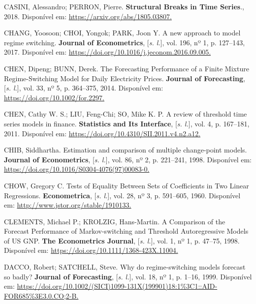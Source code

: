 \documentclass[
  letterpaper,
  DIV=11,
  numbers=noendperiod]{scrartcl}
\newlength{\cslhangindent}
\newenvironment{CSLReferences}[2] %
 {\begin{list}{}{%
  \setlength{\itemindent}{0pt}
  \setlength{\leftmargin}{0pt}
  \setlength{\parsep}{0pt}
  \ifodd #1
   \setlength{\leftmargin}{\cslhangindent}
   \setlength{\itemindent}{-1\cslhangindent}
  \fi
  \setlength{\itemsep}{#2\baselineskip}}}
 {\end{list}}
\numberwithin{equation}{section}
\numberwithin{table}{section}
\numberwithin{figure}{section}
\begin{document}
\begin{CSLReferences}{0}{1}
CASINI, Alessandro; PERRON, Pierre. \textbf{Structural Breaks in Time
Series}., 2018. Disponível em:
\href{https://arxiv.org/abs/1805.03807}{https://arxiv.org/abs/1805.03807.
}

CHANG, Yoosoon; CHOI, Yongok; PARK, Joon Y. A new approach to model
regime switching. \textbf{Journal of Econometrics}, {[}\emph{s. l.}{]},
vol. 196, nº 1, p. 127--143, 2017. Disponível em:
\href{https://doi.org/10.1016/j.jeconom.2016.09.005}{https://doi.org/10.1016/j.jeconom.2016.09.005.
}

CHEN, Dipeng; BUNN, Derek. The Forecasting Performance of a Finite
Mixture Regime-Switching Model for Daily Electricity Prices.
\textbf{Journal of Forecasting}, {[}\emph{s. l.}{]}, vol. 33, nº 5, p.
364--375, 2014. Disponível em:
\href{https://doi.org/10.1002/for.2297}{https://doi.org/10.1002/for.2297.
}

CHEN, Cathy W. S.; LIU, Feng-Chi; SO, Mike K. P. A review of threshold
time series models in finance. \textbf{Statistics and Its Interface},
{[}\emph{s. l.}{]}, vol. 4, p. 167--181, 2011. Disponível em:
\href{https://doi.org/10.4310/SII.2011.v4.n2.a12}{https://doi.org/10.4310/SII.2011.v4.n2.a12.
}

CHIB, Siddhartha. Estimation and comparison of multiple change-point
models. \textbf{Journal of Econometrics}, {[}\emph{s. l.}{]}, vol. 86,
nº 2, p. 221--241, 1998. Disponível em:
\href{https://doi.org/10.1016/S0304-4076(97)00083-0}{https://doi.org/10.1016/S0304-4076(97)00083-0.
}

CHOW, Gregory C. Tests of Equality Between Sets of Coefficients in Two
Linear Regressions. \textbf{Econometrica}, {[}\emph{s. l.}{]}, vol. 28,
nº 3, p. 591--605, 1960. Disponível em:
\href{http://www.jstor.org/stable/1910133}{http://www.jstor.org/stable/1910133.
}

CLEMENTS, Michael P.; KROLZIG, Hans-Martin. A Comparison of the Forecast
Performance of Markov-switching and Threshold Autoregressive Models of
US GNP. \textbf{The Econometrics Journal}, {[}\emph{s. l.}{]}, vol. 1,
nº 1, p. 47--75, 1998. Disponível em:
\href{https://doi.org/10.1111/1368-423X.11004}{https://doi.org/10.1111/1368-423X.11004.
}

DACCO, Robert; SATCHELL, Steve. Why do regime-switching models forecast
so badly? \textbf{Journal of Forecasting}, {[}\emph{s. l.}{]}, vol. 18,
nº 1, p. 1--16, 1999. Disponível em:
\href{https://doi.org/10.1002/(SICI)1099-131X(199901)18:1\%3C1::AID-FOR685\%3E3.0.CO;2-B}{https://doi.org/10.1002/(SICI)1099-131X(199901)18:1\%3C1::AID-FOR685\%3E3.0.CO;2-B.
}


\end{CSLReferences}
\end{document}

